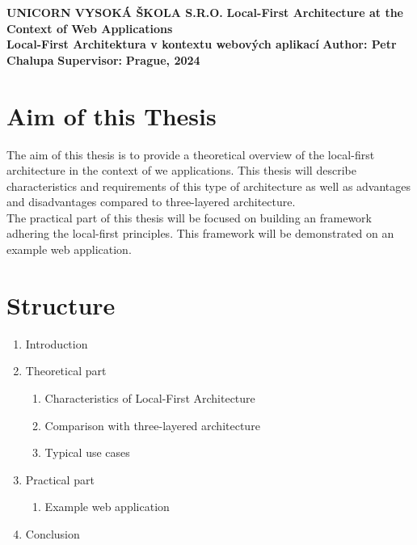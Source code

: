 \documentclass{article}
\begin{document}
	\begin{titlepage}
		\begin{center}
			\textbf{UNICORN VYSOKÁ ŠKOLA S.R.O.}
			\vfill
			\textbf{\LARGE Local-First Architecture at the Context of Web Applications}\\
			\vspace{10mm}
			\textbf{Local-First Architektura v kontextu webových aplikací}
			\vfill
			\textbf{Author: Petr Chalupa}
			\vfill
			\textbf{Supervisor: }
			\vfill
			\textbf{Prague, 2024}
			\vfill
		\end{center}
	\end{titlepage}
	\section{Aim of this Thesis}
	The aim of this thesis is to provide a theoretical overview of the local-first architecture in the context of we applications. This thesis will describe characteristics and requirements of this type of architecture as well as advantages and disadvantages compared to three-layered architecture.\\
	The practical part of this thesis will be focused on building an framework adhering the local-first principles. This framework will be demonstrated on an example web application.
	\section{Structure}
	\begin{enumerate}
		\item Introduction
		\item Theoretical part
		\begin{enumerate}[label=\arabic{enumi}.\arabic*]
			\item Characteristics of Local-First Architecture
			\item Comparison with three-layered architecture
			\item Typical use cases
		\end{enumerate}
		\item Practical part
		\begin{enumerate}[label=\arabic{enumi}.\arabic*]
			\item Example web application
		\end{enumerate}
		\item Conclusion
	\end{enumerate}
\end{document}
